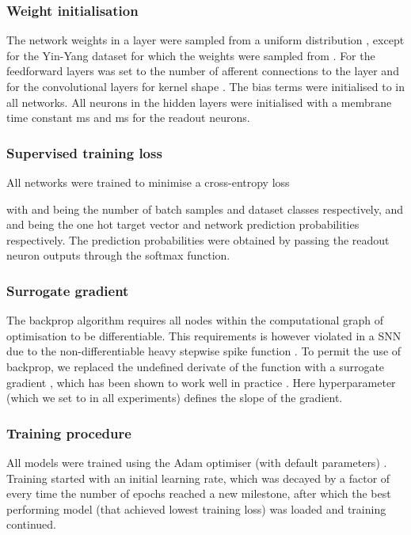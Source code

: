 \documentclass{article} \usepackage{iclr2023_conference,times}
\begin{document}
\subsubsection{Weight initialisation}

The network weights in a layer were sampled from a uniform distribution , except for the Yin-Yang dataset for which the weights were sampled from . For the feedforward layers  was set to the number of afferent connections to the layer and for the convolutional layers  for kernel shape . The bias terms were initialised to  in all networks. All neurons in the hidden layers were initialised with a membrane time constant ms and ms for the readout neurons.

\subsubsection{Supervised training loss}

All networks were trained to minimise a cross-entropy loss 



with  and  being the number of batch samples and dataset classes respectively, and  and  being the one hot target vector and network prediction probabilities respectively. The prediction probabilities  were obtained by passing the readout neuron outputs  through the softmax function.



\subsubsection{Surrogate gradient}
The backprop algorithm requires all nodes within the computational graph of optimisation to be differentiable. This requirements is however violated in a SNN due to the non-differentiable heavy stepwise spike function . To permit the use of backprop, we replaced the undefined derivate  of the function  with a surrogate gradient  \citep{zenke2018superspike}, which has been shown to work well in practice \citep{zenke2021remarkable}. Here hyperparameter  (which we set to  in all experiments) defines the slope of the gradient.



\subsubsection{Training procedure}

All models were trained using the Adam optimiser (with default parameters) \citep{kingma2014adam}. Training started with an initial learning rate, which was decayed by a factor of  every time the number of epochs reached a new milestone, after which the best performing model (that achieved lowest training loss) was loaded and training continued.
\end{document}
